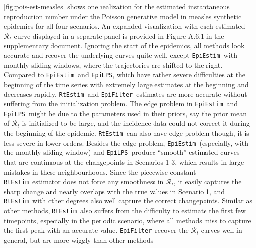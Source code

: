 \documentclass[10pt,letterpaper]{article}
\def\RtEstim{\texttt{RtEstim}}
\def\EpiEstim{\texttt{EpiEstim}}
\def\EpiLPS{\texttt{EpiLPS}}
\def\EpiFilter{\texttt{EpiFilter}}
\def\calR{\mathcal{R}}
\begin{document}
\autoref{fig:pois-est-measles} shows one realization for the estimated instantaneous 
reproduction number under the Poisson generative model in measles synthetic 
epidemics for all four scenarios. An expanded visualization with each estimated 
$\calR_t$ curve displayed in a separate panel is provided in Figure A.6.1 in the supplementary document. 
Ignoring the start of the epidemics, all methods look accurate and recover the 
underlying curves quite well, except \EpiEstim\ with monthly sliding windows, where 
the trajectories are shifted to the right. 
Compared to \EpiEstim\ and \EpiLPS, which have rather severe difficulties at the beginning
of the time series with extremely large estimates at the beginning and decreases rapidly, 
\RtEstim\ and \EpiFilter\ estimates are more accurate without suffering from the 
initialization problem. 
The edge problem in \EpiEstim\ and \EpiLPS\ might be due to the parameters
used in their priors, say the prior mean of $\calR_t$ is initialized to be large, and the incidence
data could not correct it during the beginning of the epidemic.
\RtEstim\ can also have edge problem though, it is less severe in lower orders.
Besides the edge problem, \EpiEstim\ (especially, with the 
monthly sliding window) and \EpiLPS\ produce ``smooth'' estimated curves that are 
continuous at the changepoints in Scenarios 1-3, which results in large mistakes in these neighbourhoods. 
Since the piecewise constant \RtEstim\ estimator does not force any smoothness 
in $\calR_t$, it easily captures the sharp change and nearly overlaps with the 
true values in Scenario 1, and \RtEstim\ with other degrees also well capture 
the correct changepoints. Similar as other methods, \RtEstim\ also suffers from the difficulty to estimate 
the first few timepoints, especially in the periodic scenario, 
where all methods miss to capture the first peak with an accurate value. 
\EpiFilter\ recover the $\calR_t$ curves well in general, but are more wiggly 
than other methods. 
\end{document}
